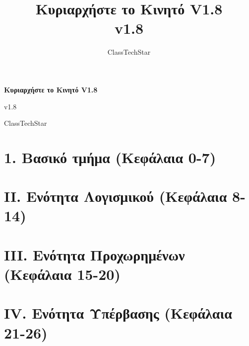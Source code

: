 \documentclass[11pt,a4paper,openany]{book}
\title{Κυριαρχήστε το Κινητό V1.8\\ \large v1.8}
\author{ClassTechStar}
\date{}
\begin{document}
\begin{titlepage}
\centering
\vspace*{0.28\textheight}
{\Huge\bfseries Κυριαρχήστε το Κινητό V1.8\par}
\vspace{1.2em}
{\Large v1.8\par}
\vfill
{\large ClassTechStar\par}
\end{titlepage}
\frontmatter
\tableofcontents
\mainmatter
\part*{1. Βασικό τμήμα (Κεφάλαια 0-7)}










\part*{II. Ενότητα Λογισμικού (Κεφάλαια 8-14)}








\part*{III. Ενότητα Προχωρημένων (Κεφάλαια 15-20)}







\part*{IV. Ενότητα Υπέρβασης (Κεφάλαια 21-26)}







\end{document}
